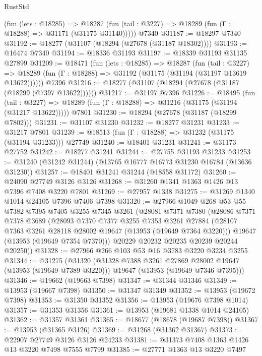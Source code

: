 \begin{lexlean}{RustStd}
\begin{coremodule}
      (fun (lets : @18285) =>
      @18287 (fun (tail : @3227) => @18289 (fun (Γ : @18288) => @31171 (@31175 @31140)))))
    @7340
@31187 := @18297 @7340
@31192 := @18277 (@31107 (@18294 (@27678 (@31187 @18302))))
@31193 := @16474 @7340
@31194 := @18336 @31193
@31197 := @18339 @31193 @31135 @27899
@31209 := @18471
    (fun (lets : @18285) =>
    @18287
      (fun (tail : @3227) =>
      @18289 (fun (Γ : @18288) => @31192 (@31175 (@31194 (@31197 @13619 @13622))))))
    @7396
@31216 := @18277 (@31107 (@18294 (@27678 (@31187 (@18299 (@7397 @13622))))))
@31217 := @31197 @7396
@31226 := @18495
    (fun (tail : @3227) => @18289 (fun (Γ : @18288) => @31216 (@31175 (@31194 (@31217 @13622)))))
    @7801
@31230 := @18294 (@27678 (@31187 (@18299 @7802)))
@31231 := @31107 @31230
@31232 := @18277 @31231
@31233 := @31217 @7801
@31239 := @18513 (fun (Γ : @18288) => @31232 (@31175 (@31194 @31233))) @27749
@31240 := @18401 @31231
@31241 := @31173 @27752
@31242 := @18277 @31241
@31244 := @27755 @31193 @31233
@31253 := @31240 (@31242 @31244) (@13765 @16777 @16773 @31230 @16784 (@13636 @31230))
@31257 := @18401 @31241 @31244 (@18558 @31172)
@31260 := @24090 @27749 @3126 @3126
@31268 := @31260 @1341 @1363 @1426 @13 @7396 @7408 @3220 @7801
@31269 := @27957 @1338
@31275 := @31269 @1340 @1014 @24105 @7396 @7406 @7398
@31320 := @27966
    @1049
    @268
    @53
    @55
    @7382
    @7395
    @7405
    @3255
    @7345
    @3261
    (@28081
      @7371
      @7380
      (@28086
        @7371
        @7378
        @3689
        (@28093
          @7370
          @7377
          @3255
          @7353
          @3261
          @27884
          (@28107 @7363 @3261 @28118 @28002 @19647 (@13953 (@19649 @7364 @3220)))
          @19647
          (@13953 (@19649 @7354 @7370)))
        @20229
        @20232
        @20235
        @20239
        @20244
        @20250))
@31328 := @27966 @266 @103 @53 @16 @3783 @3220 @3234 @3255
@31344 := @31275
    (@31320
      (@31328 @7388 @3261 @27869 @28002 @19647 (@13953 (@19649 @7389 @3220)))
      @19647
      (@13953 (@19649 @7346 @7395)))
@31346 := @19662 (@19663 @7398)
@31347 := @31344 @31346
@31349 := @13953 (@19667 @7398)
@31350 := @31347 @31349
@31352 := @13953 (@19672 @7398)
@31353 := @31350 @31352
@31356 := @13953 (@19676 @7398 @1014)
@31357 := @31353 @31356
@31361 := @13953 (@19681 @1338 @1014 @24105)
@31362 := @31357 @31361
@31365 := @18677 (@18678 (@19687 @7398))
@31367 := @13953 (@31365 @3126)
@31369 := @31268 (@31362 @31367)
@31373 := @22907 @27749 @3126 @3126 @24233
@31381 := @31373 @7408 @1363 @1426 @13 @3220 @7498 @7555 @7799
@31385 := @27771 @1363 @13 @3220 @7497

\end{coremodule}
\end{lexlean}
